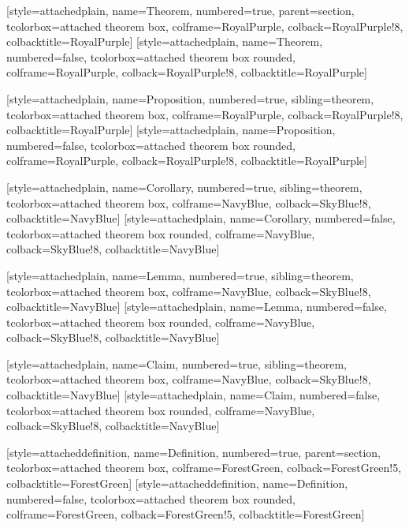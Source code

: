 
[style=attachedplain, name=Theorem, numbered=true, parent=section,
    tcolorbox={attached theorem box, colframe=RoyalPurple, colback=RoyalPurple!8, colbacktitle=RoyalPurple}]
[style=attachedplain, name=Theorem, numbered=false,
    tcolorbox={attached theorem box rounded, colframe=RoyalPurple, colback=RoyalPurple!8, colbacktitle=RoyalPurple}]

[style=attachedplain, name=Proposition, numbered=true, sibling=theorem,
    tcolorbox={attached theorem box, colframe=RoyalPurple, colback=RoyalPurple!8, colbacktitle=RoyalPurple}]
[style=attachedplain, name=Proposition, numbered=false,
    tcolorbox={attached theorem box rounded, colframe=RoyalPurple, colback=RoyalPurple!8, colbacktitle=RoyalPurple}]

[style=attachedplain, name=Corollary, numbered=true, sibling=theorem,
    tcolorbox={attached theorem box, colframe=NavyBlue, colback=SkyBlue!8, colbacktitle=NavyBlue}]
[style=attachedplain, name=Corollary, numbered=false,
    tcolorbox={attached theorem box rounded, colframe=NavyBlue, colback=SkyBlue!8, colbacktitle=NavyBlue}]

[style=attachedplain, name=Lemma, numbered=true, sibling=theorem,
    tcolorbox={attached theorem box, colframe=NavyBlue, colback=SkyBlue!8, colbacktitle=NavyBlue}]
[style=attachedplain, name=Lemma, numbered=false,
    tcolorbox={attached theorem box rounded, colframe=NavyBlue, colback=SkyBlue!8, colbacktitle=NavyBlue}]

[style=attachedplain, name=Claim, numbered=true, sibling=theorem,
    tcolorbox={attached theorem box, colframe=NavyBlue, colback=SkyBlue!8, colbacktitle=NavyBlue}]
[style=attachedplain, name=Claim, numbered=false,
    tcolorbox={attached theorem box rounded, colframe=NavyBlue, colback=SkyBlue!8, colbacktitle=NavyBlue}]

[style=attacheddefinition, name=Definition, numbered=true, parent=section,
    tcolorbox={attached theorem box, colframe=ForestGreen, colback=ForestGreen!5, colbacktitle=ForestGreen}]
[style=attacheddefinition, name=Definition, numbered=false,
    tcolorbox={attached theorem box rounded, colframe=ForestGreen, colback=ForestGreen!5, colbacktitle=ForestGreen}]

